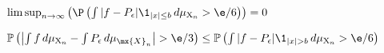 

        





\begin{lemma}
    \label{lem:first_term_of_first_term_zero}
    \uses{} %
    \notready
    $  \limsup_{n\to\infty} \left(\P\left(\int |f-P_\epsilon|\1_{|x|\le b}\,d\mu_{\mathrm{X}_n}>\e/6\right) \right) = 0$
\end{lemma}


\begin{lemma}
    \label{lem:first_term_estimate}
    \notready
    $\mathbb{P}\left(\left|\int f\,d\mu_{\mathrm{X}_n} - \int P_\epsilon\,d\mu_{\mx{X}_n}\right|>\e/3\right) \le \mathbb{P}\left(\int |f-P_\epsilon|\1_{|x|> b}\,d\mu_{\mathrm{X}_n}>\e/6\right)$
\end{lemma}

